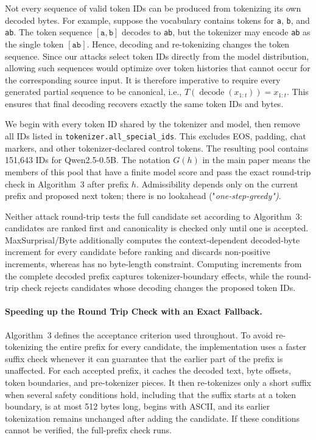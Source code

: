 \label{app:canonicality}
Not every sequence of valid token IDs can be produced from tokenizing its own decoded bytes. For example, suppose the vocabulary contains tokens for
\texttt{a}, \texttt{b}, and \texttt{ab}. The token sequence $[\texttt{a},\texttt{b}]$ decodes to \texttt{ab}, but the tokenizer may encode \texttt{ab} as the single token $[\texttt{ab}]$. Hence, decoding and re-tokenizing changes the token sequence. Since our attacks select token IDs directly from the model distribution, allowing such sequences would optimize over token histories that cannot occur for the corresponding source input. It is therefore imperative to require every generated partial sequence to be canonical, i.e., $T(\operatorname{decode}(x_{1:t}))=x_{1:t}$. This ensures that final decoding recovers exactly the same token IDs and bytes.

 We begin with every token ID shared by the tokenizer and model, then remove all IDs listed in \texttt{tokenizer.all\_special\_ids}. This excludes EOS, padding, chat markers, and other tokenizer-declared control tokens. The resulting pool contains 151,643 IDs for Qwen2.5-0.5B. The notation $G(h)$ in the main paper means the members of this pool that have a finite model score and pass the exact round-trip check in Algorithm~3 after prefix $h$. Admissibility depends only on the current prefix and proposed next token; there is no lookahead ("\textit{one-step-greedy")}.

 Neither attack round-trip tests the full candidate set according to Algorithm~3: candidates are ranked first and canonicality is checked only until one is accepted. MaxSurprisal/Byte additionally computes the context-dependent decoded-byte increment for every candidate before ranking and discards non-positive increments, whereas \MinProb{} has no byte-length constraint. Computing increments from the complete decoded prefix captures tokenizer-boundary effects, while the round-trip check rejects candidates whose decoding changes the proposed token IDs.

\paragraph{Speeding up the Round Trip Check with an Exact Fallback.} Algorithm~3 defines the acceptance criterion used throughout. To avoid re-tokenizing the entire prefix for every candidate, the implementation uses a faster suffix check whenever it can guarantee that the earlier part of the prefix is unaffected. For each accepted prefix, it caches the decoded text, byte offsets, token boundaries, and pre-tokenizer pieces. It then re-tokenizes only a short suffix when several safety conditions hold, including that the suffix starts at a token boundary, is at most 512 bytes long, begins with ASCII, and its earlier tokenization remains unchanged after adding the candidate. If these conditions cannot be verified, the full-prefix check runs.

